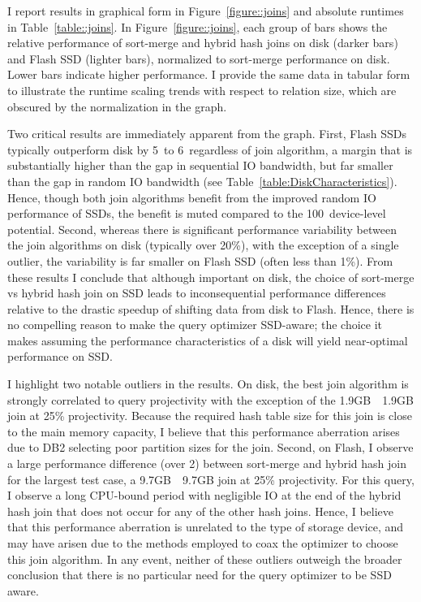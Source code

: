 I report results in graphical form in Figure~\ref{figure::joins} and absolute runtimes in Table~\ref{table::joins}.
In Figure~\ref{figure::joins}, each group of bars shows the relative performance of sort-merge and hybrid hash joins on disk (darker bars) and Flash SSD (lighter bars), normalized to sort-merge performance on disk.
Lower bars indicate higher performance.
I provide the same data in tabular form to illustrate the runtime scaling trends with respect to relation size, which are obscured by the normalization in the graph.

Two critical results are immediately apparent from the graph.  
First, Flash SSDs typically outperform disk by 5\texttimes~to 6\texttimes~regardless of join algorithm, a margin that is substantially higher than the gap in sequential IO bandwidth, but far smaller than the gap in random IO bandwidth (see Table~\ref{table:DiskCharacteristics}).
Hence, though both join algorithms benefit from the improved random IO performance of SSDs, the benefit is muted compared to the 100\texttimes~device-level potential.
Second, whereas there is significant performance variability between the join algorithms on disk (typically over 20\%), with the exception of a single outlier, the variability is far smaller on Flash SSD (often less than 1\%).
From these results I conclude that although important on disk, the choice of sort-merge vs hybrid hash join on SSD leads to inconsequential performance differences relative to the drastic speedup of shifting data from disk to Flash.
Hence, there is no compelling reason to make the query optimizer SSD-aware; the choice it makes assuming the performance characteristics of a disk will yield near-optimal performance on SSD.



I highlight two notable outliers in the results.
On disk, the best join algorithm is strongly correlated to query projectivity with the exception of the 1.9GB~\texttimes~1.9GB join at 25\% projectivity.
Because the required hash table size for this join is close to the main memory capacity, I believe that this performance aberration arises due to DB2 selecting poor partition sizes for the join.
Second, on Flash, I observe a large performance difference (over 2\texttimes) between sort-merge and hybrid hash join for the largest test case, a 9.7GB~\texttimes~9.7GB join at 25\% projectivity.
For this query, I observe a long CPU-bound period with negligible IO at the end of the hybrid hash join that does not occur for any of the other hash joins.
Hence, I believe that this performance aberration is unrelated to the type of storage device, and may have arisen due to the methods employed to coax the optimizer to choose this join algorithm.
In any event, neither of these outliers outweigh the broader conclusion that there is no particular need for the query optimizer to be SSD aware.

